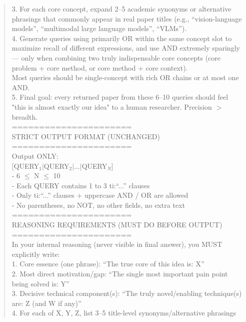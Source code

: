 \begin{quote}
\begin{tcolorbox}[breakable, colback=search!20!white, colframe=search!60!black, title=\textbf{Prompt for Search Agent (Query Generation - Literature)}]
        3. For each core concept, expand 2–5 academic synonyms or alternative phrasings that commonly appear in real paper titles (e.g., ``vision-language models'', ``multimodal large language models'', ``VLMs'').\\

        4. Generate queries using primarily OR within the same concept slot to maximize recall of different expressions, and use AND extremely sparingly — only when combining two truly indispensable core concepts (core problem + core method, or core method + core context).\\
        Most queries should be single-concept with rich OR chains or at most one AND.\\

        5. Final goal: every returned paper from these 6–10 queries should feel "this is almost exactly our idea" to a human researcher. Precision $>$ breadth.\\

        ======================\\
        STRICT OUTPUT FORMAT (UNCHANGED)\\
        ======================\\
        Output ONLY:\\

        [QUERY$_1$$\mid$QUERY$_2$$\mid$...$\mid$QUERY$_N$]\\

        - 6 $\leq$ N $\leq$ 10\\
        - Each QUERY contains 1 to 3 ti:``...'' clauses\\
        - Only ti:``...'' clauses + uppercase AND / OR are allowed\\
        - No parentheses, no NOT, no other fields, no extra text\\

        ======================\\
        REASONING REQUIREMENTS (MUST DO BEFORE OUTPUT)\\
        ======================\\
        In your internal reasoning (never visible in final answer), you MUST explicitly write:\\
        1. Core essence (one phrase): ``The true core of this idea is: X''\\
        2. Most direct motivation/gap: ``The single most important pain point being solved is: Y''\\
        3. Decisive technical component(s): ``The truly novel/enabling technique(s) are: Z (and W if any)''\\
        4. For each of X, Y, Z, list 3–5 title-level synonyms/alternative phrasings\\


\end{tcolorbox}
\end{quote}
